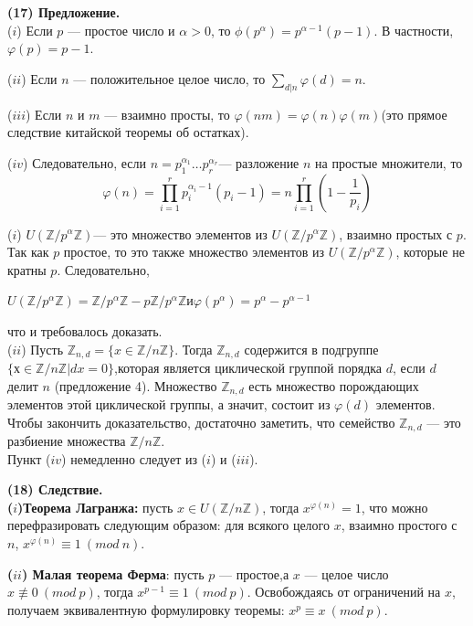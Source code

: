 \documentclass{mai_book}
\begin{document}
\textbf{(17) Предложение.} \\
($i$) Если $p$ --- простое число и $\alpha > 0$, то $\phi(p^{\alpha}) = p^{\alpha - 1}(p - 1)$. В частности, $\varphi(p) = p - 1$. \par
($ii$) Если $n$ --- положительное целое число, то $\sum_{d|n}\varphi(d) = n$. \par
($iii$) Если $n$ и $m$ --- взаимно просты, то $\varphi(nm) = \varphi(n)\varphi(m)$(это прямое следствие китайской теоремы об остатках).\par  
($iv$) Следовательно, если $n = p_1^{\alpha_1} \ldots p_r^{\alpha_r}$--- разложение $n$ на простые множители, то
$$\varphi(n) = \prod\limits_{i = 1}^{r}p_{i}^{\alpha_{i}-1}(p_{i} - 1) = n\prod\limits_{i = 1}^{r}(1 - \frac{1}{p_i})$$
\begin{myproof}
($i$) $U(\mathbb{Z}/p^{\alpha}\mathbb{Z})$--- это множество элементов из $U(\mathbb{Z}/p^{\alpha}\mathbb{Z})$, взаимно простых с $p$. Так как $p$ простое, то это также множество элементов из $U(\mathbb{Z}/p^{\alpha}\mathbb{Z})$, которые не кратны $p$. Следовательно,
\begin{center}
$U(\mathbb{Z}/p^{\alpha}\mathbb{Z}) =\mathbb{Z}/p^{\alpha}\mathbb{Z} - p\mathbb{Z}/p^{\alpha}\mathbb{Z}$\enskip и\enskip $\varphi(p^{\alpha}) = p^{\alpha} - p^{\alpha - 1}$
\end{center}
что и требовалось доказать.  \\
($ii$) Пусть $\mathbb{Z}_{n,d} = \{x \in \mathbb{Z}/n\mathbb{Z} \}$. Тогда $\mathbb{Z}_{n,d}$ содержится в подгруппе $\{ х \in \mathbb{Z}/n\mathbb{Z} | dx = 0 \}$,которая является циклической группой порядка $d$, если $d$ делит $n$ (предложение 4). Множество  $\mathbb{Z}_{n,d}$ есть множество порождающих элементов этой циклической группы, а значит, состоит из $\varphi (d)$ элементов. Чтобы закончить доказательство, достаточно заметить, что семейство $\mathbb{Z}_{n,d}$ --- это разбиение множества $\mathbb{Z}/n\mathbb{Z}$. \\
Пункт ($iv$) немедленно следует из ($i$) и ($iii$).
\end{myproof}
\textbf{(18) Следствие.} \\
  \textbf{($i$)Теорема Лагранжа:} пусть $x \in U(\mathbb{Z}/n\mathbb{Z})$, тогда $x^{\varphi (n)} = 1$, что можно перефразировать следующим образом: для всякого целого $x$, взаимно простого с $n$, $x^{\varphi(n)} \equiv 1\ (mod\ n)$. \par
  \textbf{($ii$) Малая теорема Ферма}: пусть $p$ --- простое,а $x$ — целое 
число $x \not\equiv 0\ (mod\ p)$, тогда $x^{p - 1} \equiv 1\ (mod\ p)$. Освобождаясь от ограничений на $x$, получаем эквивалентную формулировку теоремы: $x^{p}\equiv x\ (mod\ p)$.
\pagebreak
\newpage
\end{document}
